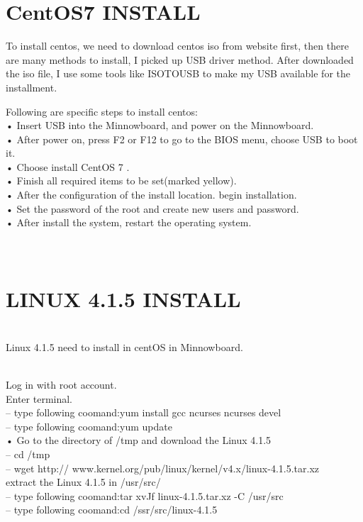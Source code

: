 \documentclass[10pt,draftclsnofoot,peerreview,letterpaper,onecolumn,]{IEEEtran}
\begin{document}
\section{CentOS7 INSTALL }
To install centos, we need to download centos iso from website first, then there are many methods to install, I picked up USB driver method. After downloaded the iso file, I use some tools like ISOTOUSB to make my USB available for the installment.

Following are specific steps to install centos:
~\\• Insert USB into the Minnowboard, and power on the Minnowboard.
~\\• After power on, press F2 or F12 to go to the BIOS menu, choose USB to boot it.
~\\• Choose install CentOS 7 .
~\\• Finish all required items to be set(marked yellow). 
~\\• After the configuration of the install location. begin installation.
~\\• Set the password of the root and create new users and password.
~\\• After install the system, restart the operating system.
~\\
~\\
~\\
\section{LINUX 4.1.5 INSTALL }
~\\  Linux 4.1.5 need to install in centOS in Minnowboard.\

~\\  Log in with root account.
~\\  Enter terminal.
~\\– type following coomand:yum install gcc ncurses ncurses devel
~\\– type following coomand:yum update
~\\• Go to the directory of /tmp and download the Linux 4.1.5
~\\– cd /tmp
~\\– wget http:// www.kernel.org/pub/linux/kernel/v4.x/linux-4.1.5.tar.xz
~\\  extract the Linux 4.1.5 in /usr/src/
~\\– type following coomand:tar xvJf linux-4.1.5.tar.xz -C /usr/src
~\\– type following coomand:cd /ssr/src/linux-4.1.5
\end{document}
